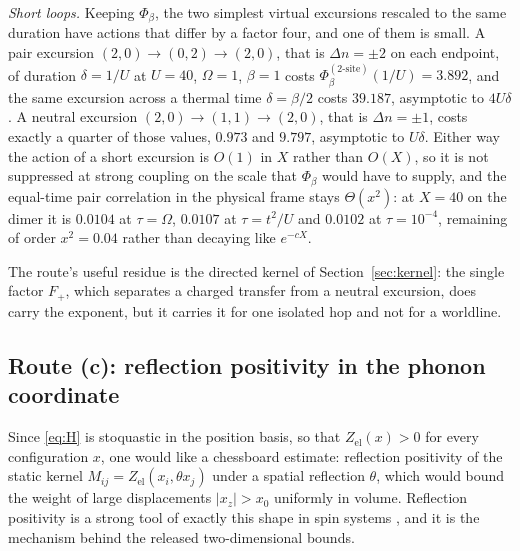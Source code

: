 \documentclass[11pt]{article}
\theoremstyle{definition}
\theoremstyle{remark}
\begin{document}
\emph{Short loops.} Keeping $\Phi_{\beta}$, the two simplest virtual excursions
rescaled to the same duration have actions that differ by a factor four, and one
of them is small. A pair excursion $(2,0)\to(0,2)\to(2,0)$, that is
$\Delta n=\pm2$ on each endpoint, of duration $\delta=1/U$ at $U=40$, $\Omega=1$,
$\beta=1$ costs $\Phi_{\beta}^{(2\text{-site})}(1/U)=3.892$, and the same
excursion across a thermal time $\delta=\beta/2$ costs $39.187$, asymptotic to
$4U\delta$. A neutral excursion $(2,0)\to(1,1)\to(2,0)$, that is
$\Delta n=\pm1$, costs exactly a quarter of those values, $0.973$ and $9.797$,
asymptotic to $U\delta$. Either way the action of a short excursion is $O(1)$ in
$X$ rather than $O(X)$, so it is not suppressed at strong coupling on the scale
that $\Phi_{\beta}$ would have to supply, and the equal-time pair correlation in
the physical frame stays $\Theta(x^{2})$: at $X=40$ on the dimer it is $0.0104$ at
$\tau=\Omega$, $0.0107$ at $\tau=t^{2}/U$ and $0.0102$ at $\tau=10^{-4}$,
remaining of order $x^{2}=0.04$ rather than decaying like $e^{-cX}$.

The route's useful residue is the directed kernel of
Section~\ref{sec:kernel}: the single factor $F_{+}$, which separates a charged
transfer from a neutral excursion, does carry the exponent, but it carries it for
one isolated hop and not for a worldline.

\subsection{Route (c): reflection positivity in the phonon coordinate}\label{sub:routec}

Since \eqref{eq:H} is stoquastic in the position basis, so that
$Z_{\mathrm{el}}(x)>0$ for every configuration $x$, one would like a chessboard
estimate: reflection positivity of the static kernel
$M_{ij}=Z_{\mathrm{el}}(x_{i},\theta x_{j})$ under a spatial reflection $\theta$,
which would bound the weight of large displacements $|x_{z}|>x_{0}$ uniformly in
volume. Reflection positivity is a strong tool of exactly this shape in spin
systems \cite{dls}, and it is the mechanism behind the released two-dimensional
bounds.
\end{document}
